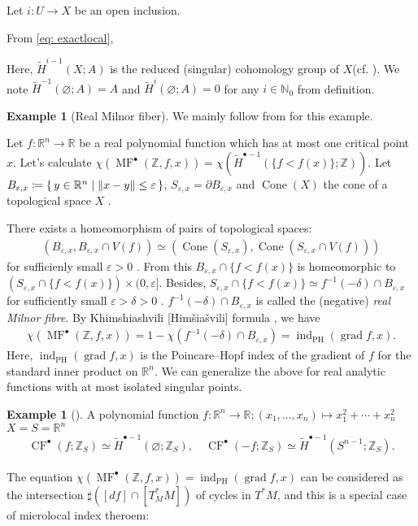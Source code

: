\documentclass[a4paper,dvipdfmx,reqno,12pt]{amsart}
\theoremstyle{definition}
\newtheorem{Eg}[Thm]{Example}
\newcommand{\deq}{\coloneqq}
\newcommand{\emp}{\varnothing}%
\newcommand{\R}{\mathbb{R}}%
\newcommand{\Z}{\mathbb{Z}}%
\newcommand{\N}{\mathbb{N}_{0}}%
\newcommand{\vep}{\varepsilon}%
\newcommand{\opn}[1]{\operatorname{#1}}
\numberwithin{equation}{section}
\begin{document}
Let $i\colon U\to X$ be an open inclusion.

From \cref{eq: exactlocal}, 


Here, $\tilde{H}^{i-1}(X;A)$ is the reduced (singular) cohomology group
of $X$(cf. \cite[p.199]{hatcherAlgebraicTopology2002a}).
We note $\tilde{H}^{-1}(\emp;A)=A$ and $\tilde{H}^{i}(\emp;A)=0$
for any $i\in \N$ from definition.

\begin{Eg}[{Real Milnor fiber}] \label{eg:}
We mainly follow from \cite[3.2]{MR3779558} for this example.

Let $f\colon \R^{n}\to \R$ be a real polynomial function
which has at most one critical point $x$.
Let's calculate 
$\chi (\opn{MF}^{\bullet}(\Z,f,x))
=\chi(\tilde{H}^{\bullet-1}(\{f<f(x)\};\Z))$.
Let $B_{\vep,x}\deq \set{y\in \R^{n}\mid \|x-y\|\leq \vep}$,
$S_{\vep,x}=\partial B_{\vep,x}$ and 
$\opn{Cone}(X)$ the cone of a topological space $X$
\cite[Example 4.4]{hatcherAlgebraicTopology2002a}.

There exists a homeomorphism of pairs of
topological spaces:
\begin{align}
(B_{\vep,x},B_{\vep,x}\cap V(f))\simeq 
(\opn{Cone}(S_{\vep,x}),\opn{Cone}(S_{\vep,x}\cap V(f)))
\end{align}
for sufficienly small $\vep>0$
\cite[Theorem 2.10]{MR0239612}.
From this $B_{\vep,x}\cap\{f<f(x)\}$ is homeomorphic to
$(S_{\vep,x}\cap \{f<f(x)\})\times (0,\vep]$.
Besides, $S_{\vep,x}\cap \{f<f(x)\}\simeq 
f^{-1}(-\delta)\cap B_{\vep,x}$
for sufficiently small $\vep>\delta>0$ 
\cite[Lemma 5.10]{MR0239612}.
$f^{-1}(-\delta)\cap B_{\vep,x}$ is called 
the (negative) \emph{real Milnor fibre}.
By Khimshiashvili [Himšiašvili] formula \cite{MR0458467}, we have
\begin{align} \label{eq: Khim}
  \chi(\opn{MF}^{\bullet}(\Z,f,x))
=1-\chi(f^{-1}(-\delta)\cap B_{\vep,x})
=\opn{ind}_{\opn{PH}}(\opn{grad} f,x).
\end{align}
Here, $\opn{ind}_{\opn{PH}}(\opn{grad} f,x)$ is the 
Poincare--Hopf index of the gradient of $f$ for the standard 
inner product on $\R^{n}$.
We can generalize the above for real analytic functions with 
at most isolated singular points.
\end{Eg}

\begin{Eg}[{\cite[p.22]{MR2031639}}]
  A polynomial function $f\colon \R^{n}\to \R;(x_1,\ldots,x_n)\mapsto x_1^{2}+\cdots+x_n^{2}$
  $X=S=\R^{n}$
  \begin{align}
    \opn{CF}^{\bullet}(f;\Z_S)\simeq \tilde{H}^{\bullet-1}(\emp;\Z_S),
    \quad \opn{CF}^{\bullet}(-f;\Z_S) \simeq \tilde{H}^{\bullet-1}(S^{n-1};\Z_S).
  \end{align}
\end{Eg}
The equation $\chi(\opn{MF}^{\bullet}(\Z,f,x))=
\opn{ind}_{\opn{PH}}(\opn{grad} f,x)$ can be considered 
as the intersection $\sharp ([df]\cap [T^{*}_M M])$ of cycles in $T^{*}M$,
and this is a special case of
microlocal index theroem:
\end{document}
